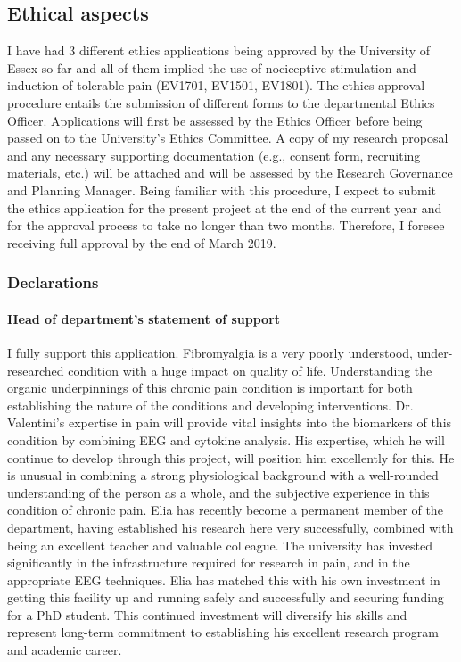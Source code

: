 \documentclass[twocolumn,  rga,issue, numeric]{jote-new-article}
\begin{document}
\subsection{Ethical aspects}


I have had 3 different ethics applications being approved by the
University of Essex so far and all of them implied the use of
nociceptive stimulation and induction of tolerable pain (EV1701, EV1501,
EV1801). The ethics approval procedure entails the submission of
different forms to the departmental Ethics Officer. Applications will
first be assessed by the Ethics Officer before being passed on to the
University's Ethics Committee. A copy of my research proposal and any
necessary supporting documentation (e.g., consent form, recruiting
materials, etc.) will be attached and will be assessed by the Research
Governance and Planning Manager. Being familiar with this procedure, I
expect to submit the ethics application for the present project at the
end of the current year and for the approval process to take no longer
than two months. Therefore, I foresee receiving full approval by the end
of March 2019.


\subsubsection{Declarations}



\noindent\paragraph{\noindent Head of department's statement of support}

I fully support this application. Fibromyalgia is a very poorly
understood, under-researched condition with a huge impact on quality of
life. Understanding the organic underpinnings of this chronic pain
condition is important for both establishing the nature of the
conditions and developing interventions. Dr. Valentini's expertise in
pain will provide vital insights into the biomarkers of this condition
by combining EEG and cytokine analysis. His expertise, which he will
continue to develop through this project, will position him excellently
for this. He is unusual in combining a strong physiological background
with a well-rounded understanding of the person as a whole, and the
subjective experience in this condition of chronic pain. Elia has
recently become a permanent member of the department, having established
his research here very successfully, combined with being an excellent
teacher and valuable colleague. The university has invested
significantly in the infrastructure required for research in pain, and
in the appropriate EEG techniques. Elia has matched this with his own
investment in getting this facility up and running safely and
successfully and securing funding for a PhD student. This continued
investment will diversify his skills and represent long-term commitment
to establishing his excellent research program and academic career.
\end{document}
